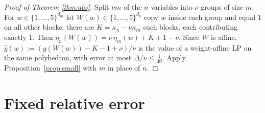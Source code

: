 \documentclass[11pt]{amsart}
\theoremstyle{plain}
\theoremstyle{definition}
\theoremstyle{remark}
\begin{document}
\begin{proof}[Proof of Theorem \ref{thm:abs}]
Split $\nu m$ of the $n$ variables into $\nu$ groups of size $m$. For $w\in\{1,\dots,5\}^{d_m}$ let $W(w)\in
\{1,\dots,5\}^{d_n}$ copy $w$ inside each group and equal $1$ on all other blocks; there are $K=\kappa_n-\nu\kappa_m$
such blocks, each contributing exactly $1$. Then $\eta_n(W(w))=\nu\,\eta_m(w)+K+1-\nu$. Since $W$ is affine,
$\hat g(w):=(g(W(w))-K-1+\nu)/\nu$ is the value of a weight-affine LP on the same polyhedron, with error at most
$\Delta/\nu\le\frac1{40}$. Apply Proposition~\ref{prop:small} with $m$ in place of $n$.
\end{proof}

\section{Fixed relative error}\label{sec:rel}
\end{document}
